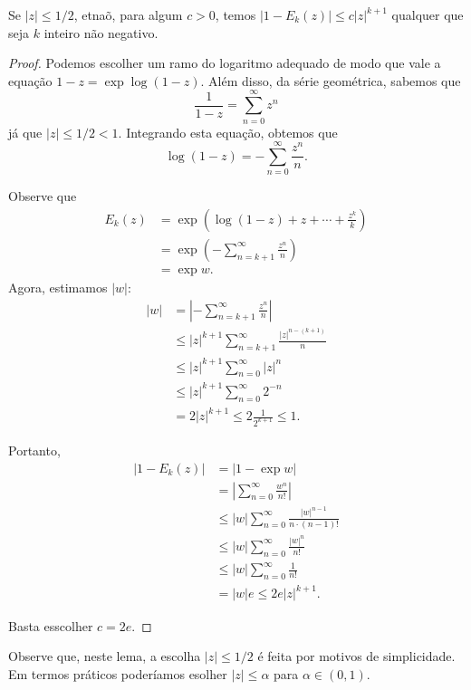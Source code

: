     \begin{lema}
    \label{lema-wstr-est-factor}
    Se $|z| \leq 1/2$, etnaõ, para algum $c>0$, temos $|1-E_k(z)| \leq c|z|^{k+1}$ qualquer que seja $k$ inteiro não negativo.
    \end{lema}
    \begin{proof}
    Podemos escolher um ramo do logaritmo adequado de modo que vale a equação $1-z = \exp{\log(1-z)}$. Além disso, da série geométrica, sabemos que 
    $$ \frac{1}{1-z} = \sum_{n=0}^{\infty}z^n $$
    já que $|z| \leq 1/2 < 1$. Integrando esta equação, obtemos que
    $$ \log(1-z) = - \sum_{n=0}^{\infty}\frac{z^n}{n}. $$
    
    Observe que 
    \begin{align*}
        E_k(z) &= \exp{\left(\log(1-z) + z + \cdots + \frac{z^k}{k}\right)} \\
        &= \exp(-\sum_{n=k+1}^{\infty}\frac{z^n}{n}) \\
        &= \exp{w}.
    \end{align*}
    Agora, estimamos $|w|$:
    \begin{align*}
        |w| &= \left | -\sum_{n=k+1}^{\infty}\frac{z^n}{n} \right | \\
        &\leq |z|^{k+1}\sum_{n=k+1}^{\infty}\frac{|z|^{n - (k+1)}}{n} \\
        &\leq |z|^{k+1}\sum_{n=0}^{\infty}|z|^n \\
        &\leq |z|^{k+1}\sum_{n=0}^{\infty} 2^{-n} \\
        &= 2|z|^{k+1} \leq 2 \frac{1}{2^{k+1}} \leq 1.
    \end{align*}
    
    Portanto,
    \begin{align*}
        |1 - E_k(z)| &= |1 - \exp{w}| \\
        &= \left | \sum_{n=0}^{\infty}\frac{w^n}{n!} \right | \\
        &\leq |w|\sum_{n=0}^{\infty}\frac{|w|^{n-1}}{n\cdot (n-1)!} \\
        &\leq |w|\sum_{n=0}^{\infty}\frac{|w|^n}{n!} \\
        &\leq |w|\sum_{n=0}^{\infty}\frac{1}{n!} \\
        &=|w|e \leq 2e|z|^{k+1}.
    \end{align*}
    
    Basta esscolher $c = 2e$.
    \end{proof}
    
    
    Observe que, neste lema, a escolha $|z| \leq 1/2$ é feita por motivos de simplicidade. Em termos práticos poderíamos esolher $|z| \leq \alpha$ para $\alpha \in (0,1)$.
    
